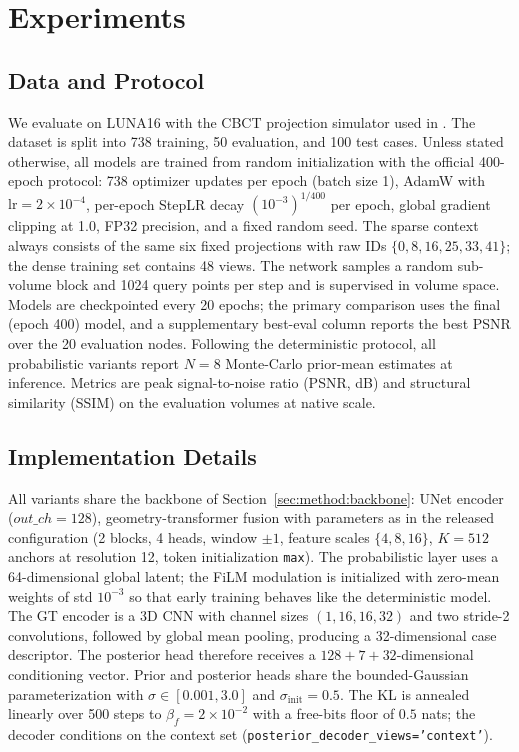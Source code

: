 
\section{Experiments}
\label{sec:exp}

\subsection{Data and Protocol}
\label{sec:exp:protocol}

We evaluate on LUNA16 \cite{setio2017luna16} with the CBCT projection
simulator used in \cite{lin2024difgaussian}. The dataset is split into
738 training, 50 evaluation, and 100 test cases. Unless stated otherwise,
all models are trained from random initialization with the official
400-epoch protocol: 738 optimizer updates per epoch (batch size 1),
AdamW with $\mathrm{lr}=2{\times}10^{-4}$, per-epoch StepLR decay
$(10^{-3})^{1/400}$ per epoch, global gradient clipping at 1.0, FP32
precision, and a fixed random seed. The sparse context always consists
of the same six fixed projections with raw IDs $\{0,8,16,25,33,41\}$;
the dense training set contains 48 views. The network samples a random
sub-volume block and 1024 query points per step and is supervised in
volume space. Models are checkpointed every 20 epochs; the primary
comparison uses the final (epoch 400) model, and a supplementary
best-eval column reports the best PSNR over the 20 evaluation nodes.
Following the deterministic protocol, all probabilistic variants report
$N{=}8$ Monte-Carlo prior-mean estimates at inference. Metrics are peak
signal-to-noise ratio (PSNR, dB) and structural similarity (SSIM) on
the evaluation volumes at native scale.

\subsection{Implementation Details}
\label{sec:exp:impl}

All variants share the backbone of Section~\ref{sec:method:backbone}:
UNet encoder ($out\_ch=128$), geometry-transformer fusion with
parameters as in the released configuration (2 blocks, 4 heads, window
$\pm1$, feature scales $\{4,8,16\}$, $K{=}512$ anchors at resolution 12,
token initialization \texttt{max}). The probabilistic layer uses a
64-dimensional global latent; the FiLM modulation is initialized with
zero-mean weights of std $10^{-3}$ so that early training behaves like
the deterministic model. The GT encoder is a 3D CNN with channel
sizes $(1,16,16,32)$ and two stride-2 convolutions, followed by global
mean pooling, producing a 32-dimensional case descriptor. The posterior
head therefore receives a $128+7+32$-dimensional conditioning
vector. Prior and posterior heads share the bounded-Gaussian
parameterization with $\sigma\in[0.001,3.0]$ and
$\sigma_{\mathrm{init}}=0.5$. The KL is annealed linearly over 500 steps
to $\beta_f{=}2{\times}10^{-2}$ with a free-bits floor of $0.5$ nats;
the decoder conditions on the context set
(\texttt{posterior\_decoder\_views='context'}).

